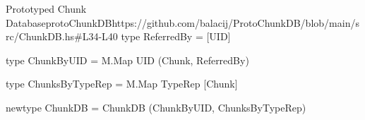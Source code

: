 \begin{haskell}{Prototyped Chunk Database}{protoChunkDB}{https://github.com/balacij/ProtoChunkDB/blob/main/src/ChunkDB.hs\#L34-L40}
type ReferredBy = [UID]

type ChunkByUID = M.Map UID (Chunk, ReferredBy)

type ChunksByTypeRep = M.Map TypeRep [Chunk]

newtype ChunkDB = ChunkDB (ChunkByUID, ChunksByTypeRep)
\end{haskell}
